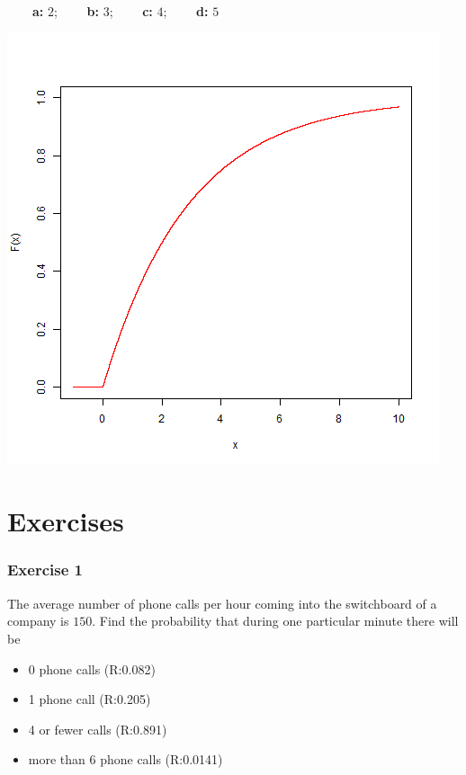 \documentclass[
]{book}
\providecommand{\tightlist}{%
  \setlength{\itemsep}{0pt}\setlength{\parskip}{0pt}}
\begin{document}
\textbf{\(\qquad\)a:} \(2\); \textbf{\(\qquad\)b:} \(3\); \textbf{\(\qquad\)c:} \(4\); \textbf{\(\qquad\)d:} \(5\)

\includegraphics{./figures/exp.png}

\hypertarget{exercises-6}{%
\section{Exercises}\label{exercises-6}}

\hypertarget{exercise-1-5}{%
\subsubsection{Exercise 1}\label{exercise-1-5}}

The average number of phone calls per hour coming into the switchboard of a company is \(150\). Find the probability that during one particular minute there will be

\begin{itemize}
\tightlist
\item
  0 phone calls (R:0.082)
\item
  1 phone call (R:0.205)
\item
  4 or fewer calls (R:0.891)
\item
  more than 6 phone calls (R:0.0141)
\end{itemize}
\end{document}
